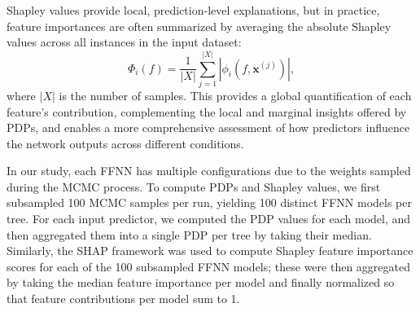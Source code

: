 Shapley values provide local, prediction-level explanations, but in practice, feature importances are often summarized by averaging the absolute Shapley values across all instances in the input dataset:
\[
    \Phi_i(f) = \frac{1}{|X|} \sum_{j=1}^{|X|} |\phi_i(f, \mathbf{x}^{(j)})|,
\]
where \( |X| \) is the number of samples.
This provides a global quantification of each feature’s contribution, complementing the local and marginal insights offered by PDPs, and enables a more comprehensive assessment of how predictors influence the network outputs across different conditions.

In our study, each FFNN has multiple configurations due to the weights sampled during the MCMC process.
To compute PDPs and Shapley values, we first subsampled 100 MCMC samples per run, yielding 100 distinct FFNN models per tree.
For each input predictor, we computed the PDP values for each model, and then aggregated them into a single PDP per tree by taking their median.
Similarly, the SHAP framework \cite{lundberg2017unified} was used to compute Shapley feature importance scores for each of the 100 subsampled FFNN models; these were then aggregated by taking the median feature importance per model and finally normalized so that feature contributions per model sum to 1.